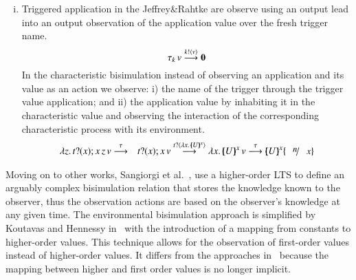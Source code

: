 \begin{enumerate}[i)]
	\item 	Triggered application in the Jeffrey\&Rahtke
		are observe using an output
		lead into an output observation of the
		application value over
		the fresh trigger name.
		\[
			\tau_k\,v \stackrel{k ! \langle v \rangle}{\longrightarrow} \mathbf{0}
		\]
		In the characteristic bisimulation instead of observing an 
		application and its value as an action we observe:
		i) the name of the trigger through the trigger value
		application; and ii) the application
		value by inhabiting it in the characteristic value
		and observing the interaction of the corresponding
		characteristic process with its environment.
		\begin{eqnarray*}
			\appl{\abs{z}{\binp{t}{x} \appl{x}{z}}}{v} &\by{\tau}& \binp{t}{x} \appl{x}{v}
			\by{\bactinp{t}{\abs{x}{\mapchar{U}{x}}}}
			\appl{\abs{x}{\mapchar{U}{x}}}{v}
			\by{\tau} \mapchar{U}{x} \subst{n}{x}
		\end{eqnarray*}
\end{enumerate}



Moving on to other works, Sangiorgi et al.~\cite{DBLP:conf/lics/SangiorgiKS07}, use a higher-order LTS 
to define an arguably complex bisimulation relation that stores the knowledge known to
the observer, thus the observation actions are based on the observer's knowledge
at any given time. 
The environmental bisimulation approach is simplified by Koutavas and
Hennessy in~\cite{DBLP:journals/cl/KoutavasH12,DBLP:conf/esop/KoutavasH11}
with the introduction
of a mapping from constants to higher-order values. This
technique allows for the observation of first-order values instead
of higher-order values. It differs from the approaches
in~\cite{San96H,DBLP:journals/lmcs/JeffreyR05} because the
mapping between higher and first order values is no longer implicit.

